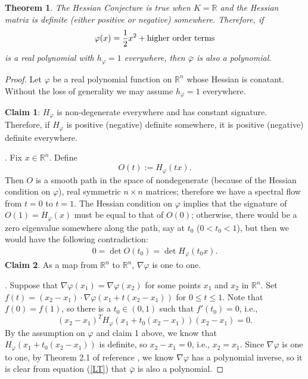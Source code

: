 \documentclass{article}
\newcommand{\bb}{\mathbb}
\newtheorem{Thm}[defn]{Theorem}
\newtheorem{main theorem}[defn]{Main Theorem}
\begin{document}
\begin{Thm} The Hessian Conjecture is true when $K=\bb{R}$ and the Hessian matrix
is definite (either positive or negative) somewhere. Therefore, if
\[
\varphi(x)={1\over 2} x^2+\mbox{higher order terms}
\]
is a real polynomial with $h_{\varphi}=1$ everywhere, then
$\bar\varphi$ is also a polynomial.
\end{Thm}
\begin{proof} Let $\varphi$ be a real polynomial function on
$\bb{R}^n$ whose Hessian is conatant. Without the loss of
generality we may assume $h_\varphi=1$ everywhere.

\smallskip
{\bf Claim 1}: $H_\varphi$ is non-degenerate everywhere and has
constant signature. Therefore, if $H_\varphi$ is positive
(negative) definite somewhere, it is positive (negative) definite
everywhere.

. Fix $x\in \bb{R}^n$. Define
\[
O(t):=H_\varphi(tx).
\]
Then $O$ is a smooth path in the space of nondegenerate (because
of the Hessian condition on $\varphi$),  real symmetric $n\times
n$ matrices; therefore we have a spectral flow from $t=0$ to
$t=1$. The Hessian condition on $\varphi$ implies that the
signature of $O(1)=H_\varphi(x)$ must be equal to that of $O(0)$;
otherwise, there would be a zero eigenvalue somewhere along the
path, say at $t_0$ ($0<t_0<1$), but then we would have the
following contradiction:
\begin{eqnarray}
0=\det O(t_0)=\det H_\varphi(t_0x).\nonumber
\end{eqnarray}
\smallskip
{\bf Claim 2}. As a map from $\bb{R}^n$ to $\bb{R}^n$,
$\nabla\varphi$ is one to one.

. Suppose that
$\nabla\varphi(x_1)=\nabla\varphi(x_2)$ for some points $x_1$ and
$x_2$ in $\bb{R}^n$. Set $f(t)=(x_2-x_1)\cdot
\nabla\varphi(x_1+t(x_2-x_1))$ for $0\le t\le 1$. Note that
$f(0)=f(1)$, so there is a $t_0\in (0,1)$ such that $f'(t_0)=0$,
i.e., $$(x_2-x_1)^T H_\varphi(x_1+t_0(x_2-x_1)) (x_2-x_1)=0.$$ By
the assumption on $\varphi$ and claim 1 above, we know that
$H_\varphi(x_1+t_0(x_2-x_1))$ is definite, so $x_2-x_1=0$, i.e.,
$x_2=x_1$.
\medskip Since $\nabla\varphi$ is one to one, by Theorem 2.1 of
reference \cite{BCW82}, we know $\nabla\varphi$ has a polynomial
inverse, so it is clear from equation (\ref{LT}) that
$\bar\varphi$ is also a polynomial.
\end{proof}
\end{document}
